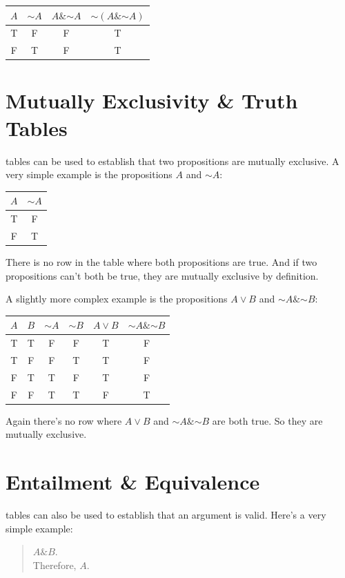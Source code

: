 \documentclass[justified]{tufte-book}
\renewcommand{\neg}{\mathbin{\sim}}
\renewcommand{\wedge}{\mathbin{\&}}
\theoremstyle{definition}
\theoremstyle{definition}
\theoremstyle{definition}
\theoremstyle{remark}
\begin{document}
\begin{longtable}[]{@{}cccc@{}}
\toprule
\(A\) & \(\neg A\) & \(A \wedge \neg A\) & \(\neg (A \wedge \neg A)\)\tabularnewline
\midrule
\endhead
T & F & F & T\tabularnewline
F & T & F & T\tabularnewline
\bottomrule
\end{longtable}

\hypertarget{mutually-exclusivity-truth-tables}{%
\section{Mutually Exclusivity \& Truth Tables}\label{mutually-exclusivity-truth-tables}}

 tables can be used to establish that two propositions are mutually exclusive. A very simple example is the propositions \(A\) and \(\neg A\):

\begin{longtable}[]{@{}cc@{}}
\toprule
\(A\) & \(\neg A\)\tabularnewline
\midrule
\endhead
T & F\tabularnewline
F & T\tabularnewline
\bottomrule
\end{longtable}

There is no row in the table where both propositions are true. And if two propositions can't both be true, they are mutually exclusive by definition.

A slightly more complex example is the propositions \(A \vee B\) and \(\neg A \wedge \neg B\):

\begin{longtable}[]{@{}cccccc@{}}
\toprule
\(A\) & \(B\) & \(\neg A\) & \(\neg B\) & \(A \vee B\) & \(\neg A \wedge \neg B\)\tabularnewline
\midrule
\endhead
T & T & F & F & T & F\tabularnewline
T & F & F & T & T & F\tabularnewline
F & T & T & F & T & F\tabularnewline
F & F & T & T & F & T\tabularnewline
\bottomrule
\end{longtable}

Again there's no row where \(A \vee B\) and \(\neg A \wedge \neg B\) are both true. So they are mutually exclusive.

\hypertarget{entailment-equivalence}{%
\section{Entailment \& Equivalence}\label{entailment-equivalence}}

 tables can also be used to establish that an argument is valid. Here's a very simple example:

\begin{quote}
\(A \wedge B\).\\
Therefore, \(A\).
\end{quote}
\end{document}
